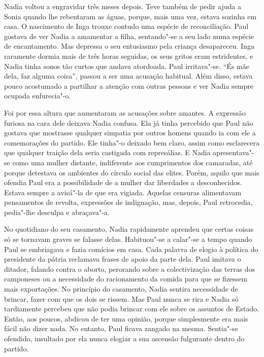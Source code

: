 Nadia voltou a engravidar três meses depois. Teve também de pedir
ajuda a Sonia quando lhe rebentaram as águas, porque, mais uma vez,
estava sozinha em casa. O nascimento de Inga trouxe contudo uma espécie
de reconciliação. Paul gostava de ver Nadia a amamentar a filha,
sentando"-se a seu lado numa espécie de encantamento. Mas depressa o
seu entusiasmo pela criança desapareceu. Inga raramente dormia mais de
três horas seguidas, os seus gritos eram estridentes, e Nadia tinha
sonos tão curtos que andava atordoada. Paul irritava"-se. ``És mãe dela,
faz alguma coisa'', passou a ser uma acusação habitual. Além disso,
estava pouco acostumado a partilhar a atenção com outras pessoas e ver
Nadia sempre ocupada enfurecia"-o.

Foi por essa altura que aumentaram as acusações
sobre amantes. A expressão furiosa na cara dele deixava Nadia confusa.
Ela já tinha percebido que Paul não gostava que mostrasse qualquer
simpatia por outros homens quando ia com ele a comemorações do partido.
Ele tinha"-o deixado bem claro, assim como esclarecera que qualquer
traição dela seria castigada com represálias. E Nadia apresentava"-se
como uma mulher distante, indiferente aos cumprimentos dos camaradas,
até porque detestava os ambientes do círculo social das elites. Porém,
aquilo que mais ofendia Paul era a possibilidade de a mulher dar
liberdades a desconhecidos. Estava sempre a avisá"-la de que era vigiada.
Aquelas censuras alimentavam pensamentos de revolta, expressões de
indignação, mas, depois, Paul retrocedia, pedia"-lhe desculpa e abraçava"-a.

No quotidiano do seu casamento, Nadia rapidamente aprendeu que certas
coisas só se tornavam graves se falasse delas. Habituou"-se a calar"-se a
tempo quando Paul se embriagava e fazia comícios em casa. Cada palavra
de elogio à política do presidente da pátria reclamava frases de apoio
da parte dela. Paul imitava o ditador, falando contra o aborto,
perorando sobre a colectivização das terras dos camponeses ou a
necessidade do racionamento da comida para que se fizessem mais
exportações. No princípio do casamento, Nadia sentira necessidade de
brincar, fazer com que os dois se rissem. Mas Paul nunca se rira e Nadia
só tardiamente percebeu que não podia brincar com ele sobre os assuntos
de Estado. Então, aos poucos, abdicou de ter uma opinião, porque
simplesmente era mais fácil não dizer nada. No entanto, Paul ficava
zangado na mesma. Sentia"-se ofendido, insultado por ela nunca elogiar a
sua ascensão fulgurante dentro do partido.

